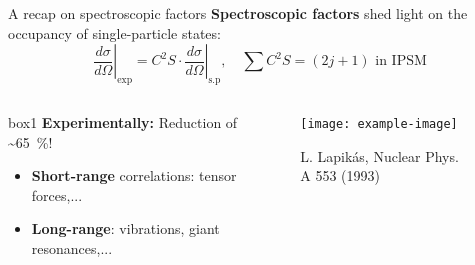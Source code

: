 \documentclass[aspectratio=43, dvipsnames]{beamer}
\begin{document}
\begin{frame}{A recap on spectroscopic factors}
	\textbf{Spectroscopic factors} shed light on the occupancy of single-particle states:
	\begin{equation*}
		\left.\frac{d\sigma}{d\Omega}\right\vert_{\text{exp}} = C^{2}S \cdot \left.\frac{d\sigma}{d\Omega}\right\vert_{\text{s.p}}, \quad \sum C^{2}S = (2j + 1) \text{ in IPSM}
	\end{equation*}
	\begin{columns}[T]
		\begin{column}{0.48\linewidth}
			\hfill{}
			\begin{beamercolorbox}[sep=0.75em, center, wd=0.85\linewidth,rounded=true]{box1}
				\textbf{Experimentally:} Reduction of \sim\qty{65}{\percent}!
			\end{beamercolorbox}%
			\hfill{}
			\begin{itemize}
				\item \textbf{Short-range} correlations: tensor forces,...
				\item \textbf{Long-range}: vibrations, giant resonances,...
			\end{itemize}
		\end{column}
		\begin{column}{0.48\linewidth}
			\vspace{-1em}
			\begin{figure}
				\texttt{[image: example-image]}
				\caption{L. Lapikás, Nuclear Phys. A 553 (1993)}
			\end{figure}
		\end{column}
	\end{columns}
\end{frame}
\end{document}
